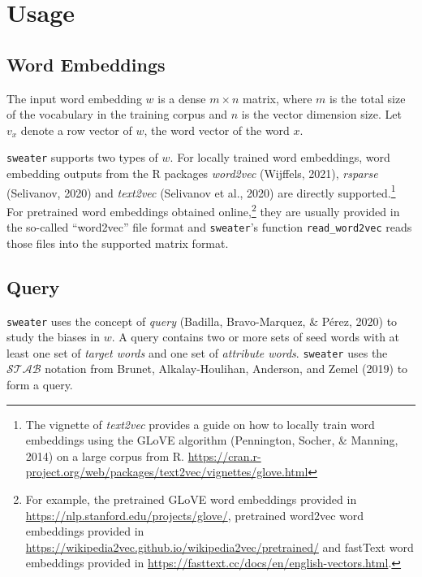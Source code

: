 \documentclass[english,man]{apa6}
\begin{document}
\hypertarget{usage}{%
\section{Usage}\label{usage}}

\hypertarget{word-embeddings}{%
\subsection{Word Embeddings}\label{word-embeddings}}

The input word embedding \(w\) is a dense \(m\times n\) matrix, where \(m\) is the total size of the vocabulary in the training corpus and \(n\) is the vector dimension size. Let \(v_x\) denote a row vector of \(w\), the word vector of the word \(x\).

\texttt{sweater} supports two types of \(w\). For locally trained word embeddings, word embedding outputs from the R packages \emph{word2vec} (Wijffels, 2021), \emph{rsparse} (Selivanov, 2020) and \emph{text2vec} (Selivanov et al., 2020) are directly supported.\footnote{The vignette of \emph{text2vec} provides a guide on how to locally train word embeddings using the GLoVE algorithm (Pennington, Socher, \& Manning, 2014) on a large corpus from R. \url{https://cran.r-project.org/web/packages/text2vec/vignettes/glove.html}} For pretrained word embeddings obtained online,\footnote{For example, the pretrained GLoVE word embeddings provided in \url{https://nlp.stanford.edu/projects/glove/}, pretrained word2vec word embeddings provided in \url{https://wikipedia2vec.github.io/wikipedia2vec/pretrained/} and fastText word embeddings provided in \url{https://fasttext.cc/docs/en/english-vectors.html}.} they are usually provided in the so-called \enquote{word2vec} file format and \texttt{sweater}'s function \texttt{read\_word2vec} reads those files into the supported matrix format.

\hypertarget{query}{%
\subsection{Query}\label{query}}

\texttt{sweater} uses the concept of \emph{query} (Badilla, Bravo-Marquez, \& Pérez, 2020) to study the biases in \(w\). A query contains two or more sets of seed words with at least one set of \emph{target words} and one set of \emph{attribute words}. \texttt{sweater} uses the \(\mathcal{S}\mathcal{T}\mathcal{A}\mathcal{B}\) notation from Brunet, Alkalay-Houlihan, Anderson, and Zemel (2019) to form a query.
\end{document}

